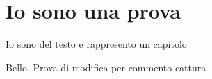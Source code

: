 \section{Io sono una prova}

Io sono del testo e rappresento un capitolo

Bello. Prova di modifica per commento-cattura
